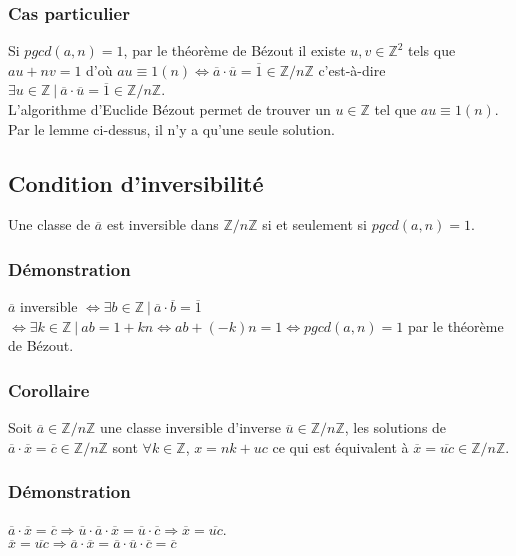 \documentclass[a4paper,10pt]{book} %
\newcommand{\Z}{\mathbb{Z}}
\newcommand{\tq}{~|~}
\begin{document}
\subsubsection{Cas particulier}
Si $pgcd(a,n)=1$, par le théorème de Bézout il existe $u, v\in \Z^2$ tels que $au+nv=1$ d'où $au\equiv 1(n)\Leftrightarrow\overline{a}\cdot \overline{u}=\overline{1}\in\Z/n\Z$ c'est-à-dire $\exists u\in \Z \tq \overline{a}\cdot \overline{u}=\overline{1}\in\Z/n\Z$.\\

L'algorithme d'Euclide Bézout permet de trouver un $u\in \Z$ tel que $au\equiv 1(n)$.\\

Par le lemme ci-dessus, il n'y a qu'une seule solution.

\newpage

\subsection{Condition d'inversibilité}
Une classe de $\overline{a}$ est inversible dans $\Z/n\Z$ si et seulement si $pgcd(a,n)=1$.

\subsubsection{Démonstration}
$\overline{a}$ inversible $\Leftrightarrow \exists b\in\Z \tq \overline{a}\cdot \overline{b}=\overline{1}$
$\Leftrightarrow \exists k \in\Z\tq ab=1+kn\Leftrightarrow ab+(-k)n=1 \Leftrightarrow pgcd(a,n)=1$ par le théorème de Bézout.

\subsubsection{Corollaire}
Soit $\overline{a}\in\Z/n\Z$ une classe inversible d'inverse $\overline{u}\in\Z/n\Z$, les solutions de $\overline{a}\cdot \overline{x}=\overline{c}\in\Z/n\Z$ sont $\forall k\in\Z$, $x=nk+uc$ ce qui est équivalent à $\overline{x}=\overline{uc} \in\Z/n\Z$.

\subsubsection{Démonstration}
$\overline{a}\cdot \overline{x}=\overline{c}\Rightarrow \overline{u}\cdot \overline{a}\cdot \overline{x}=\overline{u}\cdot\overline{c}
\Rightarrow \overline{x}=\overline{uc}$.\\

$\overline{x} =\overline{uc}\Rightarrow\overline{a}\cdot \overline{x}=\overline{a}\cdot \overline{u} \cdot \overline{c}=\overline{c}$
\end{document}
